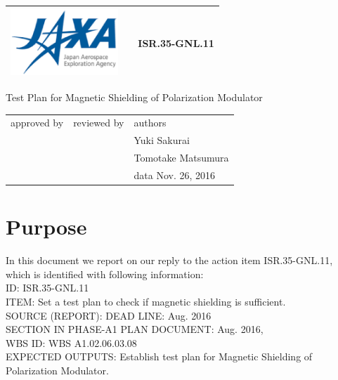 \documentclass[11pt]{article}
\begin{document}
\begin{tabular}{ |p{50mm}|p{50mm}|p{50mm}| } \hline
\includegraphics[height=25mm]{figs/images.eps} & & ISR.35-GNL.11  \rule[0mm]{0mm}{20mm} \\ \hline
\end{tabular}


\vspace*{60mm}
\begin{center}
  \LARGE
  Test Plan for Magnetic Shielding of Polarization Modulator \\
\end{center}
\vspace*{80mm}


\begin{tabular}{ |p{50mm}|p{50mm}|p{50mm}| } \hline
approved by & reviewed by  & authors  \\
& & Yuki Sakurai \\
& & Tomotake Matsumura \vspace*{15mm} \\
& & data Nov. 26, 2016 \\
\hline

\end{tabular}

\clearpage

\section*{Purpose}
In this document we report on our reply to the action item ISR.35-GNL.11, which is identified with following information: \\
ID: ISR.35-GNL.11 \\
ITEM: Set a test plan to check if magnetic shielding is sufficient. \\
SOURCE (REPORT): %
DEAD LINE: Aug. 2016 \\
SECTION IN PHASE-A1 PLAN DOCUMENT: Aug. 2016, \\ %
WBS ID: WBS A1.02.06.03.08 \\ %
EXPECTED OUTPUTS: Establish test plan for Magnetic Shielding of Polarization Modulator. \\
\end{document}
